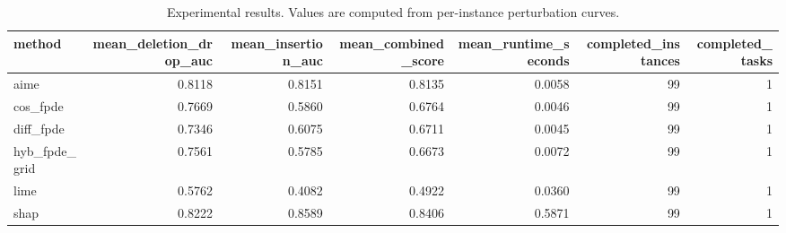 \begin{table}[t]
\caption{Experimental results. Values are computed from per-instance perturbation curves.}
\label{tab:main_results_computed}
\centering
\begin{tabular}{lrrrrrr}
\toprule
method & mean\_deletion\_drop\_auc & mean\_insertion\_auc & mean\_combined\_score & mean\_runtime\_seconds & completed\_instances & completed\_tasks \\
\midrule
aime & 0.8118 & 0.8151 & 0.8135 & 0.0058 & 99 & 1 \\
cos\_fpde & 0.7669 & 0.5860 & 0.6764 & 0.0046 & 99 & 1 \\
diff\_fpde & 0.7346 & 0.6075 & 0.6711 & 0.0045 & 99 & 1 \\
hyb\_fpde\_grid & 0.7561 & 0.5785 & 0.6673 & 0.0072 & 99 & 1 \\
lime & 0.5762 & 0.4082 & 0.4922 & 0.0360 & 99 & 1 \\
shap & 0.8222 & 0.8589 & 0.8406 & 0.5871 & 99 & 1 \\
\bottomrule
\end{tabular}

\end{table}
